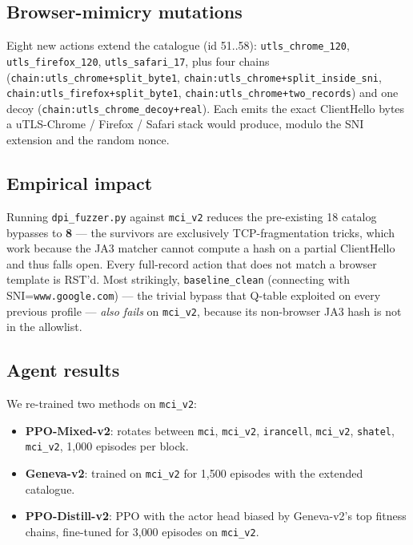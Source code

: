 \documentclass[letterpaper,twocolumn,10pt]{article}
\begin{document}
\subsection{Browser-mimicry mutations}

Eight new actions extend the catalogue (id 51..58):
\texttt{utls\_chrome\_120}, \texttt{utls\_firefox\_120},
\texttt{utls\_safari\_17}, plus four chains
(\texttt{chain:utls\_chrome+split\_byte1},
\texttt{chain:utls\_chrome+split\_inside\_sni},
\texttt{chain:utls\_firefox+split\_byte1},
\texttt{chain:utls\_chrome+two\_records}) and one decoy
(\texttt{chain:utls\_chrome\_decoy+real}). Each emits the exact
ClientHello bytes a uTLS-Chrome / Firefox / Safari stack would
produce, modulo the SNI extension and the random nonce.

\subsection{Empirical impact}

Running \texttt{dpi\_fuzzer.py} against \texttt{mci\_v2} reduces the
pre-existing 18 catalog bypasses to \textbf{8} — the survivors are
exclusively TCP-fragmentation tricks, which work because the JA3
matcher cannot compute a hash on a partial ClientHello and thus
falls open. Every full-record action that does not match a browser
template is RST'd. Most strikingly, \texttt{baseline\_clean}
(connecting with SNI=\texttt{www.google.com}) — the trivial bypass
that Q-table exploited on every previous profile — \emph{also fails}
on \texttt{mci\_v2}, because its non-browser JA3 hash is not in the
allowlist.

\subsection{Agent results}

We re-trained two methods on \texttt{mci\_v2}:
\begin{itemize}
    \item \textbf{PPO-Mixed-v2}: rotates between \texttt{mci},
    \texttt{mci\_v2}, \texttt{irancell}, \texttt{mci\_v2},
    \texttt{shatel}, \texttt{mci\_v2}, 1{,}000 episodes per block.
    \item \textbf{Geneva-v2}: trained on \texttt{mci\_v2} for
    1{,}500 episodes with the extended catalogue.
    \item \textbf{PPO-Distill-v2}: PPO with the actor head biased by
    Geneva-v2's top fitness chains, fine-tuned for 3{,}000 episodes
    on \texttt{mci\_v2}.
\end{itemize}
\end{document}
